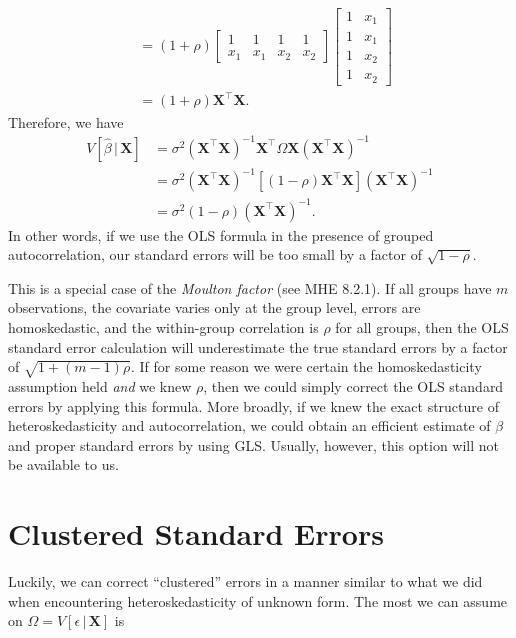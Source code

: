 \documentclass[12pt,oneside,openany]{book}
\begin{document}
\[\begin{aligned}
&= (1 + \rho) \begin{bmatrix}
1 & 1 & 1 & 1 \\
x_1 & x_1 & x_2 & x_2
\end{bmatrix}
\begin{bmatrix}
1 & x_1 \\
1 & x_1 \\
1 & x_2 \\
1 & x_2
\end{bmatrix} \\
&= (1 + \rho) \mathbf{X}^\top \mathbf{X}.
\end{aligned}
\] Therefore, we have \[
\begin{aligned}
V[\hat{\beta} \,|\, \mathbf{X}]
&= \sigma^2 (\mathbf{X}^\top \mathbf{X})^{-1} \mathbf{X}^\top \Omega \mathbf{X} (\mathbf{X}^\top \mathbf{X})^{-1} \\
&= \sigma^2 (\mathbf{X}^\top \mathbf{X})^{-1} [(1 - \rho) \mathbf{X}^\top \mathbf{X}] (\mathbf{X}^\top \mathbf{X})^{-1} \\
&= \sigma^2 (1 - \rho) (\mathbf{X}^\top \mathbf{X})^{-1}.
\end{aligned}
\] In other words, if we use the OLS formula in the presence of grouped
autocorrelation, our standard errors will be too small by a factor of
\(\sqrt{1 - \rho}\).

This is a special case of the \emph{Moulton factor} (see MHE 8.2.1). If
all groups have \(m\) observations, the covariate varies only at the
group level, errors are homoskedastic, and the within-group correlation
is \(\rho\) for all groups, then the OLS standard error calculation will
underestimate the true standard errors by a factor of
\(\sqrt{1 + (m - 1) \rho}\). If for some reason we were certain the
homoskedasticity assumption held \emph{and} we knew \(\rho\), then we
could simply correct the OLS standard errors by applying this formula.
More broadly, if we knew the exact structure of heteroskedasticity and
autocorrelation, we could obtain an efficient estimate of \(\beta\) and
proper standard errors by using GLS. Usually, however, this option will
not be available to us.

\section{Clustered Standard Errors}\label{clustered-standard-errors}

Luckily, we can correct ``clustered'' errors in a manner similar to what
we did when encountering heteroskedasticity of unknown form. The most we
can assume on \(\Omega = V[\epsilon \,|\, \mathbf{X}]\) is
\end{document}
